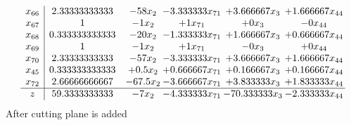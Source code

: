 \documentclass[11pt]{article}
\begin{document}
\[\begin{array}{c| c c@{\hskip 2pt} c@{\hskip 2pt} c@{\hskip 2pt} c@{\hskip 2pt} }
 x_{66}   &  2.33333333333 & -58 x_{2} & -3.333333 x_{71} & + 3.666667 x_{3} & + 1.666667 x_{44}\\
 x_{67}   &  1 & -1 x_{2} & + 1 x_{71} & + 0 x_{3} & -0 x_{44}\\
 x_{68}   &  0.333333333333 & -20 x_{2} & -1.333333 x_{71} & + 1.666667 x_{3} & + 0.666667 x_{44}\\
 x_{69}   &  1 & -1 x_{2} & + 1 x_{71} & -0 x_{3} & + 0 x_{44}\\
 x_{70}   &  2.33333333333 & -57 x_{2} & -3.333333 x_{71} & + 3.666667 x_{3} & + 1.666667 x_{44}\\
 x_{45}   &  0.333333333333 & + 0.5 x_{2} & + 0.666667 x_{71} & + 0.166667 x_{3} & + 0.166667 x_{44}\\
 x_{72}   &  2.66666666667 & -67.5 x_{2} & -3.666667 x_{71} & + 3.833333 x_{3} & + 1.833333 x_{44}\\
\hline
z    &  59.3333333333 & -7 x_{2} & -4.333333 x_{71} & -70.333333 x_{3} & -2.333333 x_{44}\\
\end{array}\]
 After cutting plane is added 
\end{document}

